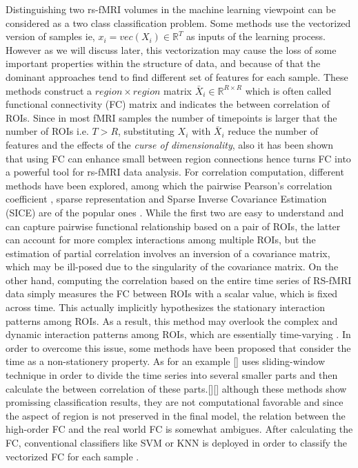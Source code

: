 \documentclass[journal]{IEEEtran}
\begin{document}
	
	Distinguishing two rs-fMRI volumes in the machine learning viewpoint can be considered as a two class classification problem.
	Some methods use the vectorized version of samples ie, $x_i = vec(X_i)\in \mathbb{R}^T$ as  inputs of the learning process. However as we will discuss later, this vectorization may cause the loss of some important properties within the structure of data, and because of that the dominant approaches tend to find different set of features for each sample. These methods  construct a $region \times region$ matrix $\bar{X}_i \in \mathbb{R}^{R \times R}$ which is often called functional connectivity (FC) matrix and indicates the between correlation of ROIs. Since in most fMRI samples the number of timepoints is larger that the number of ROIs i.e.  $ T  > R$, substituting $X_i$ with $\bar{X}_i$ reduce the number of features and the effects of the \textit{curse of dimensionality}, also 
	it has been shown that using FC can enhance small between region connections hence turns FC into a powerful tool for rs-fMRI data analysis. For correlation computation, different methods have been explored, among which the pairwise Pearson’s correlation coefficient \cite{r10, r11}, sparse representation \cite{r10, r12, r13}  and Sparse Inverse Covariance Estimation (SICE) are of the popular ones \cite{r14, r15}. While the first two are easy to understand and can capture pairwise functional relationship based on a pair of ROIs, the latter can account for more complex interactions among multiple ROIs, but the estimation of partial correlation involves an inversion of a covariance matrix, which may be ill-posed due to the singularity of the covariance matrix. On the other hand, computing the correlation based on the entire time series of RS-fMRI data simply measures the FC between ROIs with a scalar value, which is fixed across time. This actually implicitly hypothesizes the stationary interaction patterns among ROIs. As a result, this method may overlook the complex and dynamic interaction patterns among ROIs, which are essentially time-varying \cite{r16}\textendash \cite{r19}.
	In order to overcome this issue, some methods have been proposed that consider the time as a non-stationery property. As for an example [] uses sliding-window technique in order to divide the time series into several smaller parts and then calculate the between correlation of these parts.[][] although these methods show promissing classification results, they are not computational favorable and since the aspect of region is not preserved in the final model, the relation between the high-order FC and the real world FC is somewhat ambigues. After calculating the FC, conventional classifiers like SVM or KNN is deployed in order to classify the vectorized FC for each sample \cite{r20}. 
	
\end{document}
